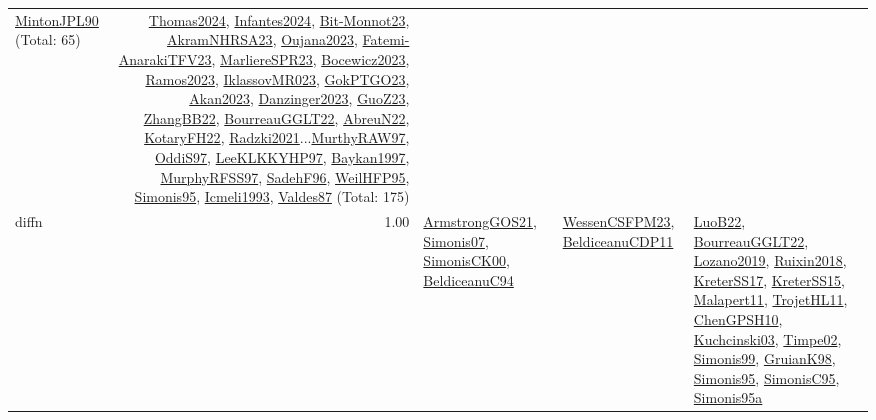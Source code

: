 {\begin{longtable}{p{3cm}r>{\raggedright\arraybackslash}p{6cm}>{\raggedright\arraybackslash}p{6cm}>{\raggedright\arraybackslash}p{8cm}}
\hyperref[detail:MintonJPL90]{MintonJPL90} (Total: 65) & \hyperref[detail:Thomas2024]{Thomas2024}, \hyperref[detail:Infantes2024]{Infantes2024}, \hyperref[detail:Bit-Monnot23]{Bit-Monnot23}, \hyperref[detail:AkramNHRSA23]{AkramNHRSA23}, \hyperref[detail:Oujana2023]{Oujana2023}, \hyperref[detail:Fatemi-AnarakiTFV23]{Fatemi-AnarakiTFV23}, \hyperref[detail:MarliereSPR23]{MarliereSPR23}, \hyperref[detail:Bocewicz2023]{Bocewicz2023}, \hyperref[detail:Ramos2023]{Ramos2023}, \hyperref[detail:IklassovMR023]{IklassovMR023}, \hyperref[detail:GokPTGO23]{GokPTGO23}, \hyperref[detail:Akan2023]{Akan2023}, \hyperref[detail:Danzinger2023]{Danzinger2023}, \hyperref[detail:GuoZ23]{GuoZ23}, \hyperref[detail:ZhangBB22]{ZhangBB22}, \hyperref[detail:BourreauGGLT22]{BourreauGGLT22}, \hyperref[detail:AbreuN22]{AbreuN22}, \hyperref[detail:KotaryFH22]{KotaryFH22}, \hyperref[detail:Radzki2021]{Radzki2021}...\hyperref[detail:MurthyRAW97]{MurthyRAW97}, \hyperref[detail:OddiS97]{OddiS97}, \hyperref[detail:LeeKLKKYHP97]{LeeKLKKYHP97}, \hyperref[detail:Baykan1997]{Baykan1997}, \hyperref[detail:MurphyRFSS97]{MurphyRFSS97}, \hyperref[detail:SadehF96]{SadehF96}, \hyperref[detail:WeilHFP95]{WeilHFP95}, \hyperref[detail:Simonis95]{Simonis95}, \hyperref[detail:Icmeli1993]{Icmeli1993}, \hyperref[detail:Valdes87]{Valdes87} (Total: 175)\\
\index{diffn}\index{Constraints!diffn}diffn &  1.00 & \hyperref[detail:ArmstrongGOS21]{ArmstrongGOS21}, \hyperref[detail:Simonis07]{Simonis07}, \hyperref[detail:SimonisCK00]{SimonisCK00}, \hyperref[detail:BeldiceanuC94]{BeldiceanuC94} & \hyperref[detail:WessenCSFPM23]{WessenCSFPM23}, \hyperref[detail:BeldiceanuCDP11]{BeldiceanuCDP11} & \hyperref[detail:LuoB22]{LuoB22}, \hyperref[detail:BourreauGGLT22]{BourreauGGLT22}, \hyperref[detail:Lozano2019]{Lozano2019}, \hyperref[detail:Ruixin2018]{Ruixin2018}, \hyperref[detail:KreterSS17]{KreterSS17}, \hyperref[detail:KreterSS15]{KreterSS15}, \hyperref[detail:Malapert11]{Malapert11}, \hyperref[detail:TrojetHL11]{TrojetHL11}, \hyperref[detail:ChenGPSH10]{ChenGPSH10}, \hyperref[detail:Kuchcinski03]{Kuchcinski03}, \hyperref[detail:Timpe02]{Timpe02}, \hyperref[detail:Simonis99]{Simonis99}, \hyperref[detail:GruianK98]{GruianK98}, \hyperref[detail:Simonis95]{Simonis95}, \hyperref[detail:SimonisC95]{SimonisC95}, \hyperref[detail:Simonis95a]{Simonis95a}\\

\end{longtable}}

